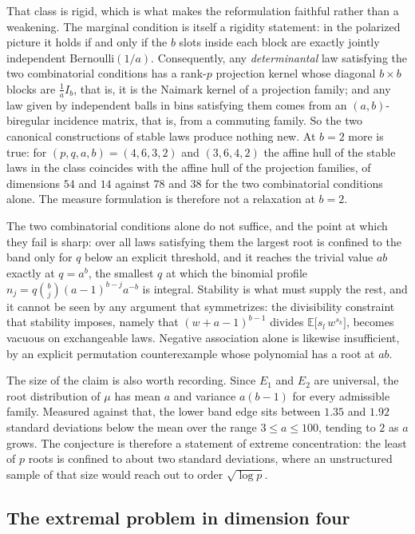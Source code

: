 \documentclass[11pt]{article}
\theoremstyle{remark}
\begin{document}
That class is rigid, which is what makes the reformulation faithful rather than a
weakening. The marginal condition is itself a rigidity statement: in the polarized
picture it holds if and only if the $b$ slots inside each block are exactly jointly
independent Bernoulli$(1/a)$. Consequently, any \emph{determinantal} law satisfying
the two combinatorial conditions has a rank-$p$ projection kernel whose diagonal
$b\times b$ blocks are $\tfrac1aI_b$, that is, it is the Naimark kernel of a
projection family; and any law given by independent balls in bins satisfying them
comes from an $(a,b)$-biregular incidence matrix, that is, from a commuting family.
So the two canonical constructions of stable laws produce nothing new. At $b=2$ more
is true: for $(p,q,a,b)=(4,6,3,2)$ and $(3,6,4,2)$ the affine hull of the stable laws
in the class coincides with the affine hull of the projection families, of dimensions
$54$ and $14$ against $78$ and $38$ for the two combinatorial conditions alone. The
measure formulation is therefore not a relaxation at $b=2$.

The two combinatorial conditions alone do not suffice, and the point at which they
fail is sharp: over all laws satisfying them the largest root is confined to the band
only for $q$ below an explicit threshold, and it reaches the trivial value $ab$
exactly at $q=a^b$, the smallest $q$ at which the binomial profile
$n_j=q\binom bj(a-1)^{b-j}a^{-b}$ is integral. Stability is what must supply the
rest, and it cannot be seen by any argument that symmetrizes: the divisibility
constraint that stability imposes, namely that $(w+a-1)^{b-1}$ divides
$\mathbb E\bigl[s_l\,w^{s_k}\bigr]$, becomes vacuous on exchangeable laws.
Negative association alone is likewise insufficient, by an explicit permutation
counterexample whose polynomial has a root at $ab$.

The size of the claim is also worth recording. Since $E_1$ and $E_2$ are universal,
the root distribution of $\mu$ has mean $a$ and variance $a(b-1)$ for every
admissible family. Measured against that, the lower band edge sits between $1.35$
and $1.92$ standard deviations below the mean over the range $3\le a\le100$,
tending to $2$ as $a$ grows. The conjecture is therefore a statement of extreme
concentration: the least of $p$ roots is confined to about two standard deviations,
where an unstructured sample of that size would reach out to order
$\sqrt{\log p}$.

\subsection{The extremal problem in dimension four}
\end{document}
